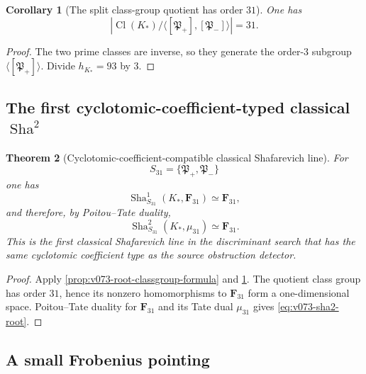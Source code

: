 \documentclass[11pt]{article}
\newtheorem{theorem}{Theorem}[section]
\newtheorem{corollary}[theorem]{Corollary}
\theoremstyle{remark}
\providecommand{\Sha}{\operatorname{Sha}}
\begin{document}
\begin{corollary}[The split class-group quotient has order \(31\)]
\label{cor:v073-class-quotient31}
One has
\begin{equation}
 \boxed{
 \left|
 \operatorname{Cl}(K_*)/
 \langle[\mathfrak P_+],[\mathfrak P_-]\rangle
 \right|
 =31.}
 \label{eq:v073-class-quotient31}
\end{equation}
\end{corollary}

\begin{proof}
The two prime classes are inverse, so they generate the order-\(3\) subgroup
\(\langle[\mathfrak P_+]\rangle\).  Divide
\(h_{K_*}=93\) by \(3\).
\end{proof}


\subsection{The first cyclotomic-coefficient-typed classical \texorpdfstring{\(\Sha^2\)}{Sha2}}

\begin{theorem}[Cyclotomic-coefficient-compatible classical Shafarevich line]
\label{thm:v073-root-sha-one}
For
\[
 S_{31}=\{\mathfrak P_+,\mathfrak P_-\}
\]
one has
\begin{equation}
 \boxed{
 \Sha^1_{S_{31}}(K_*,\mathbf F_{31})
 \simeq\mathbf F_{31},}
 \label{eq:v073-sha1-root}
\end{equation}
and therefore, by Poitou--Tate duality,
\begin{equation}
 \boxed{
 \Sha^2_{S_{31}}(K_*,\mu_{31})
 \simeq\mathbf F_{31}.}
 \label{eq:v073-sha2-root}
\end{equation}
This is the first classical Shafarevich line in the discriminant search that
has the same cyclotomic coefficient type as the source obstruction detector.
\end{theorem}

\begin{proof}
Apply \cref{prop:v073-root-classgroup-formula} and
\cref{cor:v073-class-quotient31}.  The quotient class group has order
\(31\), hence its nonzero homomorphisms to \(\mathbf F_{31}\) form a
one-dimensional space.  Poitou--Tate duality for
\(\mathbf F_{31}\) and its Tate dual \(\mu_{31}\) gives
\eqref{eq:v073-sha2-root}.
\end{proof}


\subsection{A small Frobenius pointing}
\end{document}
